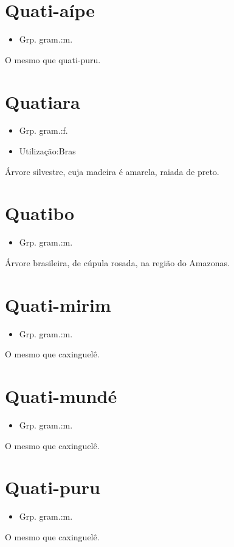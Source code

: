 \section{Quati-aípe}
\begin{itemize}
\item {Grp. gram.:m.}
\end{itemize}
O mesmo que \textunderscore quati-puru\textunderscore .
\section{Quatiara}
\begin{itemize}
\item {Grp. gram.:f.}
\end{itemize}
\begin{itemize}
\item {Utilização:Bras}
\end{itemize}
Árvore silvestre, cuja madeira é amarela, raiada de preto.
\section{Quatibo}
\begin{itemize}
\item {Grp. gram.:m.}
\end{itemize}
Árvore brasileira, de cúpula rosada, na região do Amazonas.
\section{Quati-mirim}
\begin{itemize}
\item {Grp. gram.:m.}
\end{itemize}
O mesmo que \textunderscore caxinguelê\textunderscore .
\section{Quati-mundé}
\begin{itemize}
\item {Grp. gram.:m.}
\end{itemize}
O mesmo que \textunderscore caxinguelê\textunderscore .
\section{Quati-puru}
\begin{itemize}
\item {Grp. gram.:m.}
\end{itemize}
O mesmo que \textunderscore caxinguelê\textunderscore .
